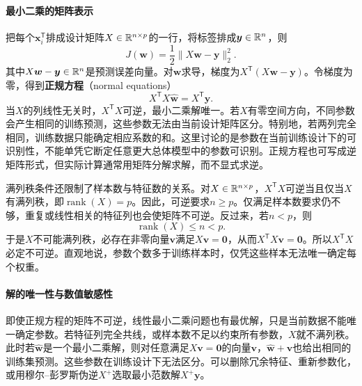 \paragraph{最小二乘的矩阵表示}
把每个$\bm x_i^{\mathsf T}$排成设计矩阵$X\in\mathbb{R}^{n\times p}$的一行，将标签排成$\bm y\in\mathbb{R}^n$，则
\begin{equation}
 J(\bm w)=\frac12\|X\bm w-\bm y\|_2^2.\label{eq:linear-least-squares}
\end{equation}
其中$X\bm w-\bm y\in\mathbb{R}^n$是预测误差向量。对$\bm w$求导，梯度为$X^{\mathsf T}(X\bm w-\bm y)$。令梯度为零，得到\textbf{正规方程}（normal equations）
\begin{equation}
 X^{\mathsf T}X\hat{\bm w}=X^{\mathsf T}\bm y.\label{eq:linear-normal-equation}
\end{equation}
当$X$的列线性无关时，$X^{\mathsf T}X$可逆，最小二乘解唯一。若$X$有零空间方向，不同参数会产生相同的训练预测，这些参数无法由当前设计矩阵区分。特别地，若两列完全相同，训练数据只能确定相应系数的和。这里讨论的是参数在当前训练设计下的可识别性，不能单凭它断定任意更大总体模型中的参数可识别。正规方程也可写成逆矩阵形式，但实际计算通常用矩阵分解求解，而不显式求逆。

满列秩条件还限制了样本数与特征数的关系。对$X\in\mathbb{R}^{n\times p}$，$X^{\mathsf T}X$可逆当且仅当$X$有满列秩，即$\operatorname{rank}(X)=p$。因此，可逆要求$n\geq p$。仅满足样本数要求仍不够，重复或线性相关的特征列也会使矩阵不可逆。反过来，若$n<p$，则
\begin{equation}
 \operatorname{rank}(X)\leq n<p.
\end{equation}
于是$X$不可能满列秩，必存在非零向量$\bm v$满足$X\bm v=\bm0$，从而$X^{\mathsf T}X\bm v=\bm0$。所以$X^{\mathsf T}X$必定不可逆。直观地说，参数个数多于训练样本时，仅凭这些样本无法唯一确定每个权重。

\paragraph{解的唯一性与数值敏感性}
即使正规方程的矩阵不可逆，线性最小二乘问题也有最优解，只是当前数据不能唯一确定参数。若特征列完全共线，或样本数不足以约束所有参数，$X$就不满列秩。此时若$\hat{\bm w}$是一个最小二乘解，则对任意满足$X\bm v=\bm0$的向量$\bm v$，$\hat{\bm w}+\bm v$也给出相同的训练集预测。这些参数在训练设计下无法区分。可以删除冗余特征、重新参数化，或用穆尔--彭罗斯伪逆$X^+$选取最小范数解$X^+\bm y$。

